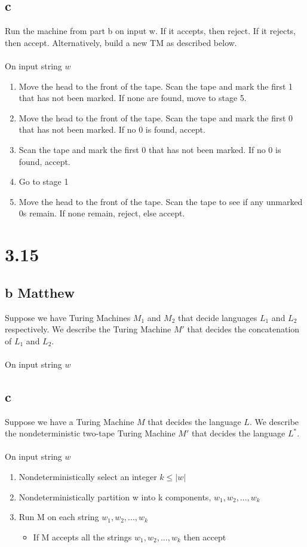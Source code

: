 \documentclass{article}
\begin{document}
\subsection*{c}
Run the machine from part b on input w. If it accepts, then reject. If it rejects, then accept. Alternatively, build a new TM as described below.\\\\
On input string $w$
\begin{enumerate}
    \item Move the head to the front of the tape. Scan the tape and mark the first 1 that has not been marked. If none are found, move to stage 5.
    \item Move the head to the front of the tape. Scan the tape and mark the first 0 that has not been marked. If no 0 is found, accept. 
    \item Scan the tape and mark the first 0 that has not been marked. If no 0 is found, accept.
    \item Go to stage 1
    \item Move the head to the front of the tape. Scan the tape to see if any unmarked 0s remain. If none remain, reject, else accept. 
\end{enumerate}

\section*{3.15}

\subsection*{b Matthew}
Suppose we have Turing Machines $M_1$ and $M_2$ that decide languages $L_1$ and $L_2$ respectively. We describe the Turing Machine $M'$ that decides the concatenation of $L_1$ and $L_2$.\\\\
On input string $w$

\subsection*{c}
Suppose we have a Turing Machine $M$ that decides the language $L$. We describe the nondeterministic two-tape Turing Machine $M'$ that decides the language $L^*$.\\\\
On input string $w$
\begin{enumerate}
    \item Nondeterministically select an integer $k \leq |w| $
    \item Nondeterministically partition w into k components, $w_1, w_2, ..., w_k$
    \item Run M on each string $w_1, w_2, ..., w_k$
        \begin {itemize}
        		\item If M accepts all the strings $w_1, w_2, ..., w_k$ then accept
        \end{itemize}
\end{enumerate}
\end{document}
